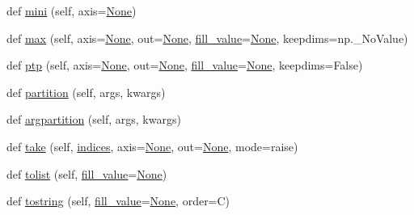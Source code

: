 \begin{DoxyCompactItemize}
\item 
def \hyperlink{classnumpy_1_1ma_1_1core_1_1MaskedArray_a59fb7098c0a6b207ad0ac3ebc9b77332}{mini} (self, axis=\hyperlink{namespacenumpy_1_1ma_1_1core_a647ee1848dfa3692fe35a663a2aa40b3}{None})
\item 
def \hyperlink{classnumpy_1_1ma_1_1core_1_1MaskedArray_ac653335e1727bac6f650f043ffd91069}{max} (self, axis=\hyperlink{namespacenumpy_1_1ma_1_1core_a647ee1848dfa3692fe35a663a2aa40b3}{None}, out=\hyperlink{namespacenumpy_1_1ma_1_1core_a647ee1848dfa3692fe35a663a2aa40b3}{None}, \hyperlink{classnumpy_1_1ma_1_1core_1_1MaskedArray_a4163711b2717238c0493739e3afea1bd}{fill\+\_\+value}=\hyperlink{namespacenumpy_1_1ma_1_1core_a647ee1848dfa3692fe35a663a2aa40b3}{None}, keepdims=np.\+\_\+\+No\+Value)
\item 
def \hyperlink{classnumpy_1_1ma_1_1core_1_1MaskedArray_a684493e00d0ddc6433b4d1f4368c151d}{ptp} (self, axis=\hyperlink{namespacenumpy_1_1ma_1_1core_a647ee1848dfa3692fe35a663a2aa40b3}{None}, out=\hyperlink{namespacenumpy_1_1ma_1_1core_a647ee1848dfa3692fe35a663a2aa40b3}{None}, \hyperlink{classnumpy_1_1ma_1_1core_1_1MaskedArray_a4163711b2717238c0493739e3afea1bd}{fill\+\_\+value}=\hyperlink{namespacenumpy_1_1ma_1_1core_a647ee1848dfa3692fe35a663a2aa40b3}{None}, keepdims=False)
\item 
def \hyperlink{classnumpy_1_1ma_1_1core_1_1MaskedArray_a2e72e03a8228f3b660b0b554d102f9f1}{partition} (self, args, kwargs)
\item 
def \hyperlink{classnumpy_1_1ma_1_1core_1_1MaskedArray_a69a1a85b23db3297f1c2ceb38d4c95af}{argpartition} (self, args, kwargs)
\item 
def \hyperlink{classnumpy_1_1ma_1_1core_1_1MaskedArray_ac47b0b42e9c8d2fc1876e08131fb29bc}{take} (self, \hyperlink{namespacenumpy_1_1ma_1_1core_a1cba93d768a61f51e74e5c5f7e8233f7}{indices}, axis=\hyperlink{namespacenumpy_1_1ma_1_1core_a647ee1848dfa3692fe35a663a2aa40b3}{None}, out=\hyperlink{namespacenumpy_1_1ma_1_1core_a647ee1848dfa3692fe35a663a2aa40b3}{None}, mode=\textquotesingle{}raise\textquotesingle{})
\item 
def \hyperlink{classnumpy_1_1ma_1_1core_1_1MaskedArray_aa56556dfc54677c3fe8aff2e44a030e3}{tolist} (self, \hyperlink{classnumpy_1_1ma_1_1core_1_1MaskedArray_a4163711b2717238c0493739e3afea1bd}{fill\+\_\+value}=\hyperlink{namespacenumpy_1_1ma_1_1core_a647ee1848dfa3692fe35a663a2aa40b3}{None})
\item 
def \hyperlink{classnumpy_1_1ma_1_1core_1_1MaskedArray_acc5fba0f4f112f4bb10fc450e8a483cc}{tostring} (self, \hyperlink{classnumpy_1_1ma_1_1core_1_1MaskedArray_a4163711b2717238c0493739e3afea1bd}{fill\+\_\+value}=\hyperlink{namespacenumpy_1_1ma_1_1core_a647ee1848dfa3692fe35a663a2aa40b3}{None}, order=\textquotesingle{}C\textquotesingle{})

\end{DoxyCompactItemize}
